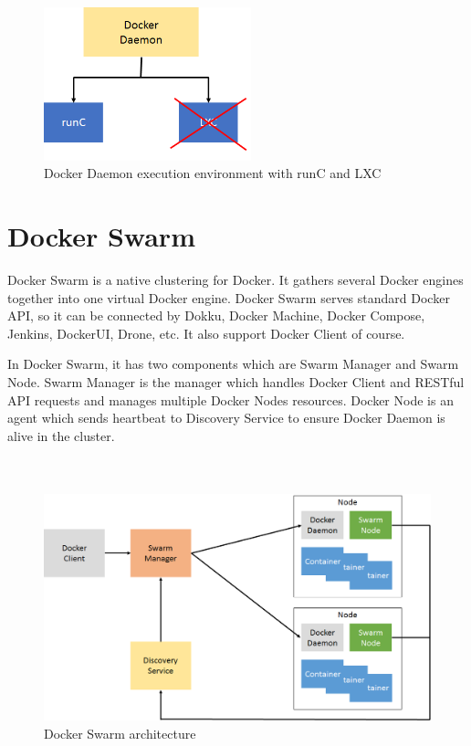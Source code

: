 \begin{figure}[h]
\begin{center}
\includegraphics[width=6cm]{figure/docker_LXC.png}
\end{center}
\caption{Docker Daemon execution environment with runC and LXC}
\label{fig:docker_LXC}
\end{figure}

\section{Docker Swarm}
Docker Swarm \cite{DockerSwarm} is a native clustering for Docker. It gathers several Docker engines together into one virtual Docker engine. Docker Swarm serves standard Docker API, so it can be connected by Dokku, Docker Machine, Docker Compose, Jenkins, DockerUI, Drone, etc. It also support Docker Client of course.

In Docker Swarm, it has two components which are Swarm Manager and Swarm Node. Swarm Manager is the manager which handles Docker Client and RESTful API requests and manages multiple Docker Nodes resources. Docker Node is an agent which sends heartbeat to Discovery Service to ensure Docker Daemon is alive in the cluster.
\\
\\
\\
\begin{figure}[h]
\begin{center}
\includegraphics[width=15cm]{figure/swarm_docker.png}
\end{center}
\caption{Docker Swarm architecture}
\end{figure}


